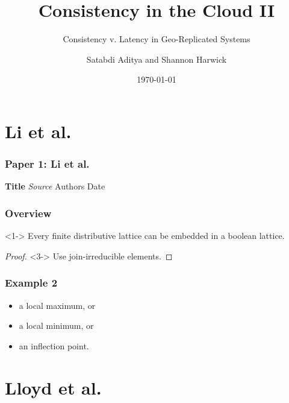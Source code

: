 \documentclass{beamer}
\title{Consistency in the Cloud II}
\subtitle{Consistency v. Latency in Geo-Replicated Systems}
\author{Satabdi Aditya and Shannon Harwick}
\institute{University of Illinois at Chicago}
\date{\today}
\begin{document}
\begin{frame}[plain]
  \titlepage
\end{frame}




\section{Li et al.} 

\begin{frame}
\frametitle{Paper 1: Li et al.}

\textbf{Title} \newline
\textit{Source} \newline
Authors\newline
Date\newline

\end{frame}



\begin{frame}
\frametitle{Overview}

\begin{theorem}<1->
Every finite distributive lattice can be embedded in a boolean lattice.
\end{theorem}
\begin{proof}<3->
Use join-irreducible elements.
\end{proof}
\end{frame}



\begin{frame}
\frametitle{Example 2}
\begin{itemize}
\pause \item a local maximum, or %
\pause \item a local minimum, or
\pause \item an inflection point.
\end{itemize}  
\end{frame}




\section{Lloyd et al.} 
\end{document}
